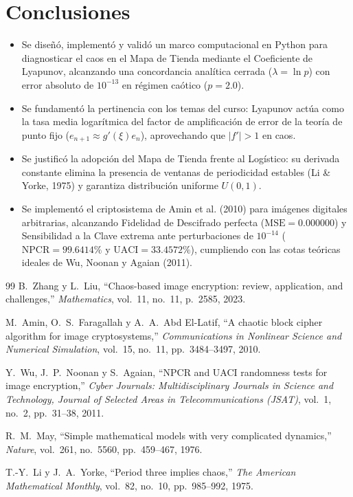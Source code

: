 \documentclass[11pt,letterpaper]{article}
\begin{document}
\section{Conclusiones}
\begin{itemize}
    \item Se diseñó, implementó y validó un marco computacional en Python para diagnosticar el caos en el Mapa de Tienda mediante el Coeficiente de Lyapunov, alcanzando una concordancia analítica cerrada ($\lambda = \ln p$) con error absoluto de $10^{-13}$ en régimen caótico ($p=2.0$).
    \item Se fundamentó la pertinencia con los temas del curso: Lyapunov actúa como la tasa media logarítmica del factor de amplificación de error de la teoría de punto fijo ($e_{n+1} \approx g'(\xi)e_n$), aprovechando que $|f'| > 1$ en caos.
    \item Se justificó la adopción del Mapa de Tienda frente al Logístico: su derivada constante elimina la presencia de ventanas de periodicidad estables (Li \& Yorke, 1975) y garantiza distribución uniforme $U(0, 1)$.
    \item Se implementó el criptosistema de Amin et al. (2010) para imágenes digitales arbitrarias, alcanzando Fidelidad de Descifrado perfecta ($\text{MSE} = 0.000000$) y Sensibilidad a la Clave extrema ante perturbaciones de $10^{-14}$ ($\text{NPCR} = 99.6414\%$ y $\text{UACI} = 33.4572\%$), cumpliendo con las cotas teóricas ideales de Wu, Noonan y Agaian (2011).
\end{itemize}
\newpage
\begin{thebibliography}{99}
B.~Zhang y L.~Liu, ``Chaos-based image encryption: review, application, and challenges,'' \textit{Mathematics}, vol.~11, no.~11, p.~2585, 2023.

M.~Amin, O.~S.~Faragallah y A.~A.~Abd El-Latif, ``A chaotic block cipher algorithm for image cryptosystems,'' \textit{Communications in Nonlinear Science and Numerical Simulation}, vol.~15, no.~11, pp.~3484--3497, 2010.

Y.~Wu, J.~P.~Noonan y S.~Agaian, ``NPCR and UACI randomness tests for image encryption,'' \textit{Cyber Journals: Multidisciplinary Journals in Science and Technology, Journal of Selected Areas in Telecommunications (JSAT)}, vol.~1, no.~2, pp.~31--38, 2011.

R.~M.~May, ``Simple mathematical models with very complicated dynamics,'' \textit{Nature}, vol.~261, no.~5560, pp.~459--467, 1976.

T.-Y.~Li y J.~A.~Yorke, ``Period three implies chaos,'' \textit{The American Mathematical Monthly}, vol.~82, no.~10, pp.~985--992, 1975.
\end{thebibliography}
\end{document}
